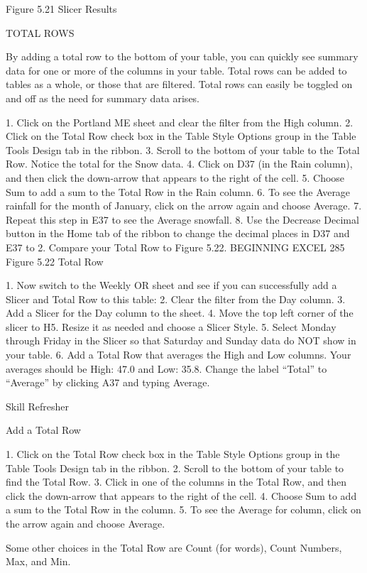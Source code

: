 Figure 5.21 Slicer Results


TOTAL ROWS

By adding a total row to the bottom of your table, you can quickly see summary data for one or more
of the columns in your table. Total rows can be added to tables as a whole, or those that are filtered.
Total rows can easily be toggled on and off as the need for summary data arises.

1. Click on the Portland ME sheet and clear the filter from the High column.
2. Click on the Total Row check box in the Table Style Options group in the Table Tools Design tab
in the ribbon.
3. Scroll to the bottom of your table to the Total Row. Notice the total for the Snow data.
4. Click on D37 (in the Rain column), and then click the down-arrow that appears to the right of
the cell.
5. Choose Sum to add a sum to the Total Row in the Rain column.
6. To see the Average rainfall for the month of January, click on the arrow again and choose
Average.
7. Repeat this step in E37 to see the Average snowfall.
8. Use the Decrease Decimal button in the Home tab of the ribbon to change the decimal places in
D37 and E37 to 2. Compare your Total Row to Figure 5.22.
BEGINNING EXCEL 285
Figure 5.22 Total Row


1. Now switch to the Weekly OR sheet and see if you can successfully add a Slicer and Total Row
to this table:
2. Clear the filter from the Day column.
3. Add a Slicer for the Day column to the sheet.
4. Move the top left corner of the slicer to H5. Resize it as needed and choose a Slicer Style.
5. Select Monday through Friday in the Slicer so that Saturday and Sunday data do NOT show in
your table.
6. Add a Total Row that averages the High and Low columns. Your averages should be High: 47.0
and Low: 35.8. Change the label “Total” to “Average” by clicking A37 and typing Average.


Skill Refresher


Add a Total Row

1. Click on the Total Row check box in the Table Style Options group in the Table Tools Design tab in the
ribbon.
2. Scroll to the bottom of your table to find the Total Row.
3. Click in one of the columns in the Total Row, and then click the down-arrow that appears to the right of
the cell.
4. Choose Sum to add a sum to the Total Row in the column.
5. To see the Average for column, click on the arrow again and choose Average.

Some other choices in the Total Row are Count (for words), Count Numbers, Max, and Min.





